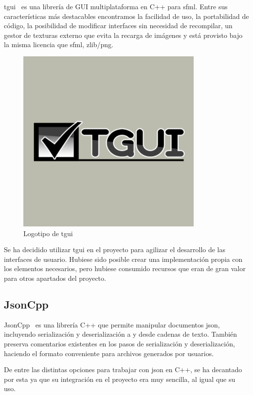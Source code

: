 		\acrfull{tgui}~\cite{tgui} es una librería de GUI multiplataforma en C++ para \acrshort{sfml}. Entre sus características más destacables encontramos la facilidad de uso, la portabilidad de código, la posibilidad de modificar interfaces sin necesidad de recompilar, un gestor de texturas externo que evita la recarga de imágenes y está provisto bajo la misma licencia que \acrshort{sfml}, zlib/png.

		\begin{figure}[!htp]
			 \centering
			 \includegraphics[scale=.75]{fig/tgui}
			 \caption{Logotipo de \acrshort{tgui}}
			 \label{fig:tgui}
		\end{figure}

		\FloatBarrier

		Se ha decidido utilizar \acrshort{tgui} en el proyecto para agilizar el desarrollo de las interfaces de usuario. Hubiese sido posible crear una implementación propia con los elementos necesarios, pero hubiese consumido recursos que eran de gran valor para otros apartados del proyecto.

	\subsection{JsonCpp}

		JsonCpp~\cite{jsoncpp} es una librería C++ que permite manipular documentos \acrshort{json}, incluyendo serialización y deserialización a y desde cadenas de texto. También preserva comentarios existentes en los pasos de serialización y deserialización, haciendo el formato conveniente para archivos generados por usuarios.

		De entre las distintas opciones para trabajar con \acrshort{json} en C++, se ha decantado por esta ya que su integración en el proyecto era muy sencilla, al igual que su uso.

